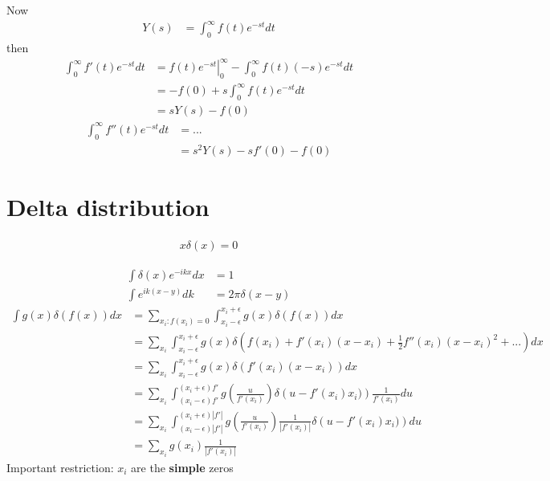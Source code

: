 \documentclass[10pt,a4paper]{book}
\theoremstyle{definition}
\begin{document}
Now
\begin{align}
Y(s)&=\int_0^\infty f(t)e^{-st}dt
\end{align}
then
\begin{align}
\int_0^\infty f'(t)e^{-st}dt
&=\left.f(t)e^{-st}\right|_0^\infty-\int_0^\infty f(t)(-s)e^{-st}dt\\
&=-f(0)+s\int_0^\infty f(t)e^{-st}dt\\
&=sY(s)-f(0)
\end{align}
\begin{align}
\int_0^\infty f''(t)e^{-st}dt
&=...\\
&=s^2Y(s)-sf'(0)-f(0)
\end{align}

\section{Delta distribution}
\begin{align}
x\delta(x)=0
\end{align}

\begin{align}
    \int\delta(x)e^{-ikx}dx&=1\\
    \int e^{ik(x-y)}dk&=2\pi\delta(x-y)
\end{align}
\begin{align}
    \int g(x)\delta(f(x))dx &= \sum_{x_i:f(x_i)=0}\int_{x_i-\epsilon}^{x_i+\epsilon} g(x)\delta(f(x))dx\\
    &= \sum_{x_i}\int_{x_i-\epsilon}^{x_i+\epsilon} g(x)\delta\left(f(x_i)+f'(x_i)(x-x_i)+\frac{1}{2}f''(x_i)(x-x_i)^2+...\right)dx\\
    &= \sum_{x_i}\int_{x_i-\epsilon}^{x_i+\epsilon} g(x)\delta\left(f'(x_i)(x-x_i)\right)dx\\
    &= \sum_{x_i}\int_{(x_i-\epsilon)f'}^{(x_i+\epsilon)f'} g\left(\frac{u}{f'(x_i)}\right)\delta\left(u-f'(x_i)x_i)\right)\frac{1}{f'(x_i)}du\\
    &= \sum_{x_i}\int_{(x_i-\epsilon)|f'|}^{(x_i+\epsilon)|f'|} g\left(\frac{u}{f'(x_i)}\right)\frac{1}{|f'(x_i)|}\delta\left(u-f'(x_i)x_i)\right)du\\
    &= \sum_{x_i} g(x_i)\frac{1}{|f'(x_i)|}
\end{align}
Important restriction: $x_i$ are the {\bf simple} zeros
\end{document}
